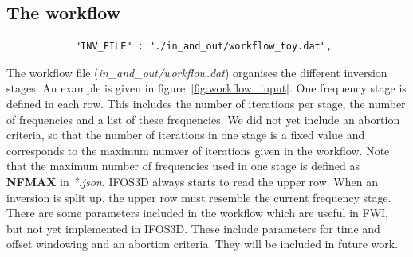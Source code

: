 \subsection{The workflow}
\begin{verbatim}
			"INV_FILE" : "./in_and_out/workflow_toy.dat",
\end{verbatim}

The workflow file (\textit{in\_and\_out/workflow.dat}) organises the different inversion stages. An example is given in figure~\ref{fig:workflow_input}. One frequency stage is defined in each row. This includes the number of iterations per stage, the number of frequencies and a list of these frequencies. We did not yet include an abortion criteria, so that the number of iterations in one stage is a fixed value and corresponds to the maximum numver of iterations given in the workflow. Note that the maximum number of frequencies used in one stage is defined as \textbf{NFMAX} in \textit{*.json}. IFOS3D always starts to read the upper row. When an inversion is split up, the upper row must resemble the current frequency stage.\\
There are some parameters included in the workflow which are useful in FWI, but not yet implemented in IFOS3D. These include parameters for time and offset windowing and an abortion criteria. They will be included in future work.

